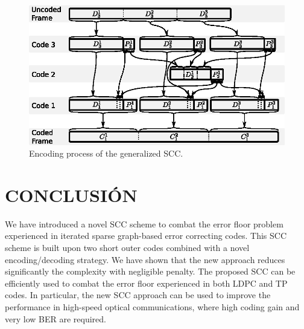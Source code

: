 \documentclass[conference]{IEEEtran}
\newcommand{\ScaleA}{1.0} %
\begin{document}
\begin{figure}[t] 
  \centerline{\includegraphics[width=\ScaleA\columnwidth]{figures_sources/drawing_v10_proposed_3_encoder.eps}}%
    \caption{Encoding process of the generalized SCC.}
    \label{fig:pro3enc} 
\end{figure}

\section{CONCLUSIÓN} \label{sec:concl} 

We have introduced a novel SCC scheme to combat the error floor
problem experienced in iterated sparse graph-based error correcting
codes. This SCC scheme is built upon two short outer codes combined
with a novel encoding/decoding strategy. We have shown that the new
approach reduces significantly the complexity with negligible
penalty. The proposed SCC can be efficiently used to combat the error
floor experienced in both LDPC and TP codes. In particular, the new
SCC approach can be used to improve the performance in high-speed
optical communications, where high coding gain and very low BER are
required.




 
\end{document}
